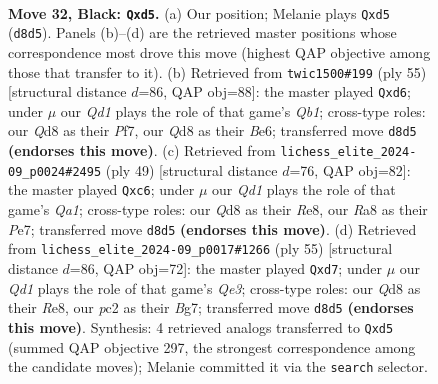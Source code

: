 \documentclass[11pt]{article}
\begin{document}
\clearpage

\begin{figure}[p]\centering
\begin{subfigure}{0.46\textwidth}\centering
\resizebox{\linewidth}{!}{%
\newchessgame
\chessboard[
  setfen={r2qrb2/ppp4k/5pp1/3Q3p/P7/2N3P1/RPP2P1P/6K1 b - - 0 32},
  showmover=false,
  pgfstyle=straightmove, color=movearrow, markmove={d8-d5}
]}
\caption{}
\end{subfigure}\hfill
\begin{subfigure}{0.46\textwidth}\centering
\resizebox{\linewidth}{!}{%
\newchessgame
\chessboard[
  setfen={1qr3k1/1p3pp1/3Qb1Np/2p5/1n5P/5BP1/1P2PP2/3R2K1 b - - 3 28},
  showmover=false,
  pgfstyle=straightmove, color=movearrow, markmove={b8-d6}
]}
\caption{}
\end{subfigure}
\\[4pt]
\begin{subfigure}{0.46\textwidth}\centering
\resizebox{\linewidth}{!}{%
\newchessgame
\chessboard[
  setfen={q3r1k1/4pp2/p1Qp1bp1/N6p/8/1P4P1/P3PP1P/3R2K1 b - - 4 25},
  showmover=false,
  pgfstyle=straightmove, color=movearrow, markmove={a8-c6}
]}
\caption{}
\end{subfigure}\hfill
\begin{subfigure}{0.46\textwidth}\centering
\resizebox{\linewidth}{!}{%
\newchessgame
\chessboard[
  setfen={4r1k1/3Q1pb1/p3q1pp/2B1p3/2P1N3/1P6/P4PPP/3R2K1 b - - 0 28},
  showmover=false,
  pgfstyle=straightmove, color=movearrow, markmove={e6-d7}
]}
\caption{}
\end{subfigure}
\caption{\textbf{Move 32, Black: \texttt{Qxd5}.} (a) Our position; Melanie plays \texttt{Qxd5} (\texttt{d8d5}). Panels (b)--(d) are the retrieved master positions whose correspondence most drove this move (highest QAP objective among those that transfer to it). (b) Retrieved from \texttt{twic1500\#199} (ply 55) [structural distance $d$=86, QAP obj=88]: the master played \texttt{Qxd6}; under $\mu$ our \emph{Qd1} plays the role of that game's \emph{Qb1}; cross-type roles: our \emph{Q}d8 as their \emph{P}f7, our \emph{Q}d8 as their \emph{B}e6; transferred move \texttt{d8d5} \textbf{(endorses this move)}. (c) Retrieved from \texttt{lichess\_elite\_2024-09\_p0024\#2495} (ply 49) [structural distance $d$=76, QAP obj=82]: the master played \texttt{Qxc6}; under $\mu$ our \emph{Qd1} plays the role of that game's \emph{Qa1}; cross-type roles: our \emph{Q}d8 as their \emph{R}e8, our \emph{R}a8 as their \emph{P}e7; transferred move \texttt{d8d5} \textbf{(endorses this move)}. (d) Retrieved from \texttt{lichess\_elite\_2024-09\_p0017\#1266} (ply 55) [structural distance $d$=86, QAP obj=72]: the master played \texttt{Qxd7}; under $\mu$ our \emph{Qd1} plays the role of that game's \emph{Qe3}; cross-type roles: our \emph{Q}d8 as their \emph{R}e8, our \emph{p}c2 as their \emph{B}g7; transferred move \texttt{d8d5} \textbf{(endorses this move)}. Synthesis: 4 retrieved analogs transferred to \texttt{Qxd5} (summed QAP objective 297, the strongest correspondence among the candidate moves); Melanie committed it via the \texttt{search} selector.}
\label{fig:thought-m63}
\end{figure}
\end{document}
